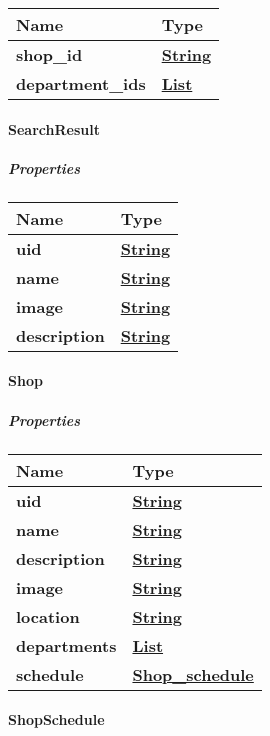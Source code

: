 \begin{longtable}[]{@{}ll@{}}
\toprule
Name & Type\tabularnewline
\midrule
\endhead
\textbf{shop\_id} & \href{string.md}{\textbf{String}}\tabularnewline
\textbf{department\_ids} &
\href{string.md}{\textbf{List}}\tabularnewline
\bottomrule
\end{longtable}

\hypertarget{searchresult}{%
\paragraph{SearchResult}\label{searchresult}}

\hypertarget{properties-7}{%
\subparagraph{Properties}\label{properties-7}}

\begin{longtable}[]{@{}ll@{}}
\toprule
Name & Type\tabularnewline
\midrule
\endhead
\textbf{uid} & \href{string.md}{\textbf{String}}\tabularnewline
\textbf{name} & \href{string.md}{\textbf{String}}\tabularnewline
\textbf{image} & \href{string.md}{\textbf{String}}\tabularnewline
\textbf{description} & \href{string.md}{\textbf{String}}\tabularnewline
\bottomrule
\end{longtable}

\hypertarget{shop}{%
\paragraph{Shop}\label{shop}}

\hypertarget{properties-8}{%
\subparagraph{Properties}\label{properties-8}}

\begin{longtable}[]{@{}ll@{}}
\toprule
Name & Type\tabularnewline
\midrule
\endhead
\textbf{uid} & \href{string.md}{\textbf{String}}\tabularnewline
\textbf{name} & \href{string.md}{\textbf{String}}\tabularnewline
\textbf{description} & \href{string.md}{\textbf{String}}\tabularnewline
\textbf{image} & \href{string.md}{\textbf{String}}\tabularnewline
\textbf{location} & \href{string.md}{\textbf{String}}\tabularnewline
\textbf{departments} &
\href{Department.md}{\textbf{List}}\tabularnewline
\textbf{schedule} &
\href{Shop_schedule.md}{\textbf{Shop\_schedule}}\tabularnewline
\bottomrule
\end{longtable}

\hypertarget{shopschedule}{%
\paragraph{ShopSchedule}\label{shopschedule}}

